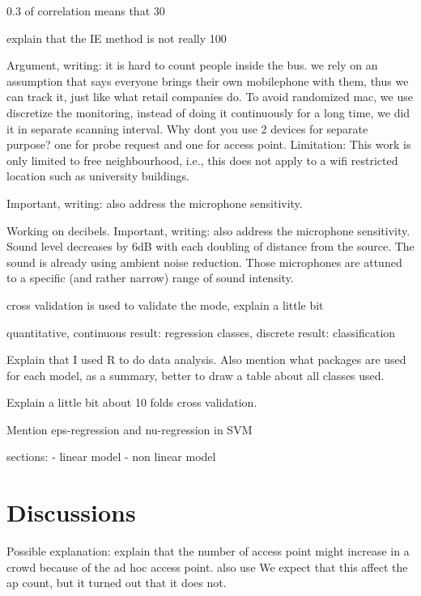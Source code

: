 0.3 of correlation means that 30%

explain that the IE method is not really 100%

Argument, writing:
it is hard to count people inside the bus.
we rely on an assumption that says everyone brings their own mobilephone with them, thus we can track it, just like what retail companies do.
To avoid randomized mac, we use discretize the monitoring, instead of doing it continuously for a long time, we did it in separate scanning interval.
Why dont you use 2 devices for separate purpose? one for probe request and one for access point.
Limitation: This work is only limited to free neighbourhood, i.e., this does not apply to a wifi restricted location such as university buildings.

Important, writing: also address the microphone sensitivity.

Working on decibels.
Important, writing: also address the microphone sensitivity.
Sound level decreases by 6dB with each doubling of distance from the source.
The sound is already using ambient noise reduction.
Those microphones are attuned to a specific (and rather narrow) range of sound intensity.

cross validation is used to validate the mode, explain a little bit

quantitative, continuous result: regression
classes, discrete result: classification

Explain that I used R to do data analysis.
Also mention what packages are used for each model, as a summary, better to draw a table about all classes used.

Explain a little bit about 10 folds cross validation.

Mention eps-regression and nu-regression in SVM

sections:
- linear model
- non linear model
\section{Discussions} %
\label{sec:discussions}
Possible explanation: explain that the number of access point might increase in a crowd because of the ad hoc access point.
also use %
We expect that this affect the ap count, but it turned out that it does not.

